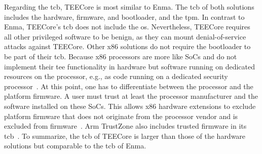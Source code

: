 Regarding the \gls{tcb}, TEECore is most similar to Enma. The \gls{tcb} of both
solutions includes the hardware, firmware, and bootloader, and the \gls{tpm}. In
contrast to Enma, TEECore's \gls{tcb} does not include the \gls{os}.
Nevertheless, TEECore requires all other privileged software to be benign, as
they can mount denial-of-service attacks against TEECore. Other x86 solutions do
not require the bootloader to be part of their \gls{tcb}. Because x86 processors
are more like SoCs and do not implement their \gls{tee} functionality in
hardware but software running on dedicated resources on the processor, e.g., as
code running on a dedicated security processor~\cite{xucode, kaplan_amd_2020}.
At this point, one has to differentiate between the processor and the platform
firmware. A user must trust at least the processor manufacturer and the software
installed on these SoCs. This allows x86 hardware extensions to exclude platform
firmware that does not originate from the processor vendor and is excluded from
firmware~\cite{xucode}. Arm TrustZone also includes trusted firmware in its
\gls{tcb}~\cite{pinto_demystifying_2019}. To summarize, the \gls{tcb} of TEECore
is larger than those of the hardware solutions but comparable to the \gls{tcb}
of Enma.

